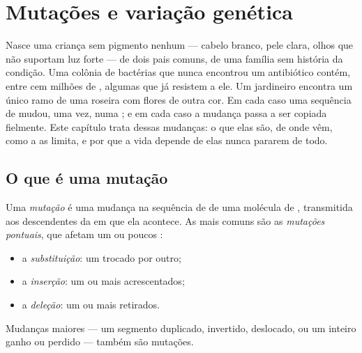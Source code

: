 \chapter{Mutações e variação genética}\label{ch:g11:mutations}

Nasce uma criança sem pigmento nenhum --- cabelo branco, pele clara,
olhos que não suportam luz forte --- de dois pais comuns, de uma
família sem história da condição. Uma colônia de bactérias que nunca
encontrou um antibiótico contém, entre cem milhões de , algumas
que já resistem a ele. Um jardineiro encontra um único ramo de uma
roseira com flores de outra cor. Em cada caso uma sequência de 
mudou, uma vez, numa ; e em cada caso a mudança passa a ser
copiada fielmente. Este capítulo trata dessas mudanças: o que elas são,
de onde vêm, como a  as limita, e por que a vida depende de elas
nunca pararem de todo.

\section{O que é uma mutação}

\begin{definition}[Mutação]\label{def:g11:mutations:mutation}
Uma \emph{mutação} é uma mudança na sequência de
 de uma molécula de , transmitida aos descendentes da
 em que ela acontece. As mais comuns são as
\emph{mutações pontuais}, que afetam um ou poucos :
\begin{itemize}
  \item a \emph{substituição}: um  trocado por outro;
  \item a \emph{inserção}: um ou mais  acrescentados;
  \item a \emph{deleção}: um ou mais  retirados.
\end{itemize}
Mudanças maiores --- um segmento duplicado, invertido, deslocado, ou um
 inteiro ganho ou perdido --- também são mutações.
\end{definition}

